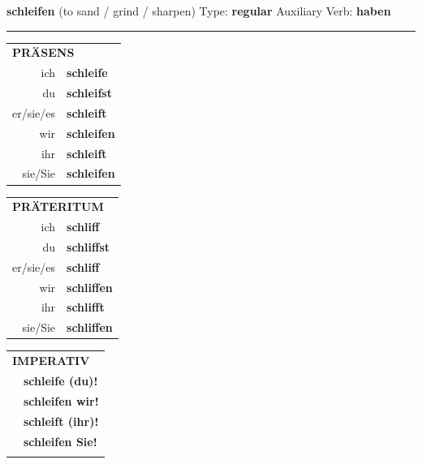 \documentclass[10pt,a4paper]{revtex4-2}
\begin{document}
\begin{verbbox}
    {\Large \bf schleifen} (to sand / grind / sharpen) \hfill Type: \textbf{regular} \hfill Auxiliary Verb: \textbf{haben} 
    
     \vspace{5pt}

    \hrule
    
    \vspace{5pt}

  \begin{tabular}{rl}
     \multicolumn{2}{l}{\textbf{PRÄSENS} }\\
    ich & \textbf{schleife}\\
    du & \textbf{schleifst}\\
    er/sie/es & \textbf{schleift}\\
    wir & \textbf{schleifen}\\
    ihr & \textbf{schleift}\\
    sie/Sie & \textbf{schleifen}\\
  \end{tabular}
  \hfill
  \begin{tabular}{rl}
    \multicolumn{2}{l}{\textbf{PRÄTERITUM} }\\
    ich & \textbf{schliff}\\
    du & \textbf{schliffst}\\
    er/sie/es & \textbf{schliff}\\
    wir & \textbf{schliffen}\\
    ihr & \textbf{schlifft}\\
    sie/Sie & \textbf{schliffen}\\
  \end{tabular}
  \hfill
  \begin{tabular}{rl}
     \multicolumn{2}{l}{\textbf{IMPERATIV} }\\
   & \textbf{schleife (du)!}\\
   & \textbf{schleifen wir!}\\
   & \textbf{schleift (ihr)!}\\
   & \textbf{schleifen Sie!}\\
   & \vspace{10pt}
  \end{tabular}

 \vspace{10pt}


\end{verbbox}
\end{document}
